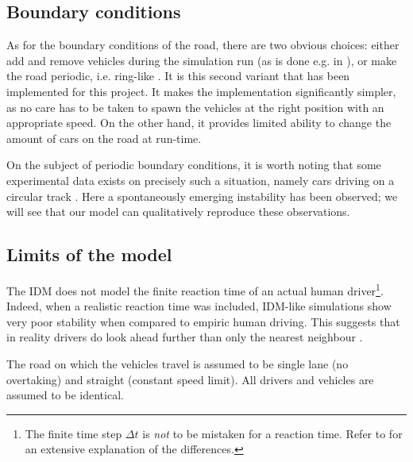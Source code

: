 \subsection{Boundary conditions}
As for the boundary conditions of the road, there are two obvious choices: either add and remove vehicles during the simulation run (as is done e.g. in \cite{treiber1999}), or make the road periodic, i.e. ring-like \cite{treiber2015}. It is this second variant that has been implemented for this project. It makes the implementation significantly simpler, as no care has to be taken to spawn the vehicles at the right position with an appropriate speed. On the other hand, it provides limited ability to change the amount of cars on the road at run-time.

On the subject of periodic boundary conditions, it is worth noting that some experimental data exists on precisely such a situation, namely cars driving on a circular track \cite{nakayama2009,tadaki2013}. Here a spontaneously emerging instability has been observed; we will see that our model can qualitatively reproduce these observations.


\subsection{Limits of the model}
The IDM does not model the finite reaction time of an actual human driver\footnote{The finite time step $\Delta t$ is \emph{not} to be mistaken for a reaction time. Refer to \cite{treiber2006} for an extensive explanation of the differences.}. Indeed, when a realistic reaction time was included, IDM-like simulations show very poor stability when compared to empiric human driving. This suggests that in reality drivers do look ahead further than only the nearest neighbour \cite{treiber2006}.

The road on which the vehicles travel is assumed to be single lane (no overtaking) and straight (constant speed limit). All drivers and vehicles are assumed to be identical.

